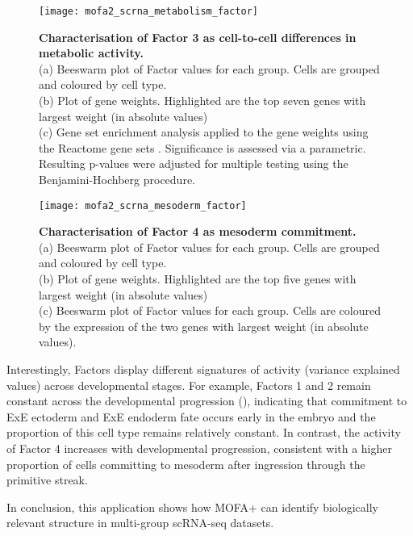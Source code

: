 \begin{figure}[H]
	\centering
	\texttt{[image: mofa2\_scrna\_metabolism\_factor]}
	\caption[]{\textbf{Characterisation of Factor 3 as cell-to-cell differences in metabolic activity.} \\
	(a) Beeswarm plot of Factor values for each group. Cells are grouped and coloured by cell type. \\
	(b) Plot of gene weights. Highlighted are the top seven genes with largest weight (in absolute values) \\
	(c) Gene set enrichment analysis applied to the gene weights using the Reactome gene sets \cite{Fabregat2015}. Significance is assessed via a parametric. Resulting p-values were adjusted for multiple testing using the Benjamini-Hochberg procedure.
	}
	\label{fig:mofa2_scrna_metabolism_factor}
\end{figure}

\begin{figure}[H]
	\centering
	\texttt{[image: mofa2\_scrna\_mesoderm\_factor]}
	\caption[]{\textbf{Characterisation of Factor 4 as mesoderm commitment.} \\
	(a) Beeswarm plot of Factor values for each group. Cells are grouped and coloured by cell type. \\
	(b) Plot of gene weights. Highlighted are the top five genes with largest weight (in absolute values) \\
	(c) Beeswarm plot of Factor values for each group. Cells are coloured by the expression of the two genes with largest weight (in absolute values).
	}
	\label{fig:mofa2_scrna_mesoderm_factor}
\end{figure} 


Interestingly, Factors display different signatures of activity (variance explained values) across developmental stages. For example, Factors 1 and 2 remain constant across the developmental progression (), indicating that commitment to ExE ectoderm and ExE endoderm fate occurs early in the embryo and the proportion of this cell type remains relatively constant. In contrast, the activity of Factor 4 increases with developmental progression, consistent with a higher proportion of cells committing to mesoderm after ingression through the primitive streak. 

In conclusion, this application shows how MOFA+ can identify biologically relevant structure in multi-group scRNA-seq datasets.

